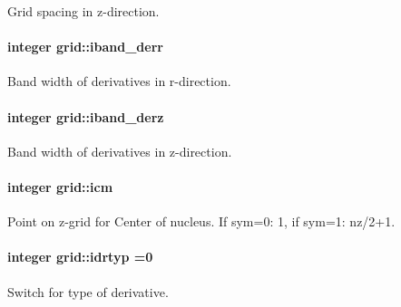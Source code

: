 Grid spacing in z-\/direction. 

\paragraph[{\texorpdfstring{iband\+\_\+derr}{iband_derr}}]{\setlength{\rightskip}{0pt plus 5cm}integer grid\+::iband\+\_\+derr}\hypertarget{namespacegrid_a44dd95d936820f4f1b37d0a1eb780862}{}\label{namespacegrid_a44dd95d936820f4f1b37d0a1eb780862}


Band width of derivatives in r-\/direction. 

\paragraph[{\texorpdfstring{iband\+\_\+derz}{iband_derz}}]{\setlength{\rightskip}{0pt plus 5cm}integer grid\+::iband\+\_\+derz}\hypertarget{namespacegrid_aa4819c3f9b94d2f272ae40641aedb49e}{}\label{namespacegrid_aa4819c3f9b94d2f272ae40641aedb49e}


Band width of derivatives in z-\/direction. 

\paragraph[{\texorpdfstring{icm}{icm}}]{\setlength{\rightskip}{0pt plus 5cm}integer grid\+::icm}\hypertarget{namespacegrid_aa34e25e6540e6c8bee7767d3bcf0bdee}{}\label{namespacegrid_aa34e25e6540e6c8bee7767d3bcf0bdee}


Point on z-\/grid for Center of nucleus. If sym=0\+: 1, if sym=1\+: nz/2+1. 

\paragraph[{\texorpdfstring{idrtyp}{idrtyp}}]{\setlength{\rightskip}{0pt plus 5cm}integer grid\+::idrtyp =0}\hypertarget{namespacegrid_adb8ca41499ab74560e9d97f2511f2cc4}{}\label{namespacegrid_adb8ca41499ab74560e9d97f2511f2cc4}


Switch for type of derivative. 

